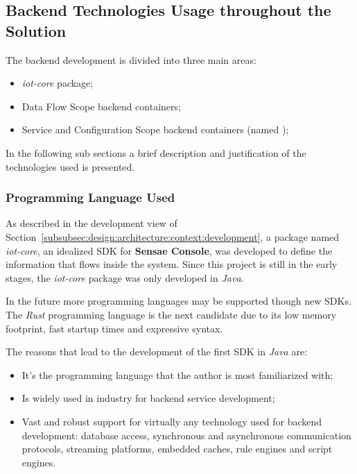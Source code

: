 \subsection{Backend Technologies Usage throughout the Solution}
\label{subsec:implementation:decisions:backend}

The backend development is divided into three main areas:

\begin{itemize}
    \item \textit{iot-core} package;
    \item Data Flow Scope backend containers;
    \item Service and Configuration Scope backend containers (named );
\end{itemize}

In the following sub sections a brief description and justification of the technologies used is presented.

\subsubsection{Programming Language Used}
\label{subsubsec:implementation:decisions:backend:prog}

As described in the development view of Section~\ref{subsubsec:design:architecture:context:development}, a package named \textit{iot-core}, an idealized \gls{SDK} for \textbf{Sensae Console}, was developed to define the information that flows inside the system. 
Since this project is still in the early stages, the \textit{iot-core} package was only developed in \textit{Java}.

In the future more programming languages may be supported though new \gls{SDK}s. The \textit{Rust} programming language is the next candidate due to its low memory footprint, fast startup times and expressive syntax.

The reasons that lead to the development of the first \gls{SDK} in \textit{Java} are:

\begin{itemize}
    \item It's the programming language that the author is most familiarized with;
    \item Is widely used in industry for backend service development;
    \item Vast and robust support for virtually any technology used for backend development: database access, synchronous and asynchronous communication protocols, streaming platforms, embedded caches, rule engines and script engines.
\end{itemize}

